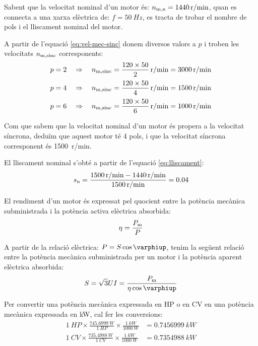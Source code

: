 \begin{exemple}
    Sabent que la velocitat nominal d'un motor és: $n_\mathrm{m,n} = \qty{1440}{r/min}$, quan es connecta a una xarxa elèctrica de: $f = \qty{50}{Hz}$,  es tracta de trobar el nombre de pols i el lliscament nominal del motor.

    A partir de l'equació \eqref{eq:vel-mec-sinc} donem diversos valors a $p$ i troben les velocitats $n_\mathrm{m,sinc}$ corresponents:
    \begin{align*}
      p = 2 \quad  &\Rightarrow \quad n\ped{m,sinc} = \frac{120 \times 50}{2} \, \unit{r/min} = \qty{3000}{r/min}\\[0.5ex]
      p = 4 \quad  &\Rightarrow \quad n\ped{m,sinc} = \frac{120 \times 50}{4} \, \unit{r/min} = \qty{1500}{r/min}\\[0.5ex]
      p = 6 \quad  &\Rightarrow \quad n\ped{m,sinc} = \frac{120 \times 50}{6} \, \unit{r/min} = \qty{1000}{r/min}
    \end{align*}

    Com que sabem que la velocitat nominal d'un motor és propera a la velocitat síncrona, deduïm que aquest motor té 4 pols, i que la velocitat síncrona corresponent és \qty{1500}{r/min}.

    El lliscament nominal s'obté a partir de l'equació \eqref{eq:lliscament}:
    \[
      s_\mathrm{n} = \frac{\qty{1500}{r/min} - \qty{1440}{r/min}}{\qty{1500}{r/min}} = \num{0,04}
    \]
\end{exemple}

El rendiment d'un motor és expressat pel quocient entre la potència mecànica subministrada i la potència activa elèctrica absorbida:
\begin{equation}\index{rendiment}\index{potència mecànica}
    \eta = \frac{P\ped{m}}{P}
\end{equation}

A partir de la relació elèctrica: $P = S \cos\varphiup$, tenim la següent relació entre la potència mecànica subministrada per un motor i la potència aparent elèctrica absorbida:
\begin{equation}
    S = \sqrt{3} U I = \frac{P\ped{m}}{\eta \cos\varphiup}\label{eq:mot-S-Pm}
\end{equation}

Per  convertir una potència mecànica expressada en HP o en CV en una  potència mecànica expressada en kW, cal  fer les conversions:
\begin{subequations}
\begin{align}
  \qty{1}{HP} \times \frac{\qty{745,6999}{W}}{\qty{1}{HP}} \times \frac{\qty{1}{kW}}{\qty{1000}{W}} &= \qty{0,7456999}{kW} \\[1ex]
  \qty{1}{CV} \times \frac{\qty{735,4988}{W}}{\qty{1}{CV}} \times \frac{\qty{1}{kW}}{\qty{1000}{W}} &= \qty{0,7354988}{kW}
\end{align}
\end{subequations}

